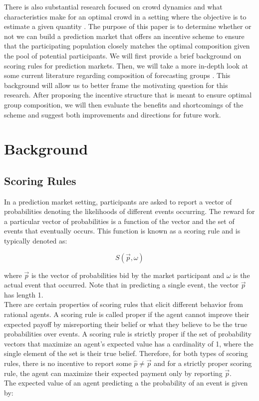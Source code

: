 \documentclass[twoside,twocolumn]{article}
\begin{document}
\newline
There is also substantial research focused on crowd dynamics and what characteristics make for an optimal crowd in a setting where the objective is to estimate a given quantity \cite{3}. The purpose of this paper is to determine whether or not we can build a prediction market that offers an incentive scheme to ensure that the participating population closely matches the optimal composition given the pool of potential participants. We will first provide a brief background on scoring rules for prediction markets. Then, we will take a more in-depth look at some current literature regarding composition of forecasting groups \cite{3}. This background will allow us to better frame the motivating question for this research. After proposing the incentive structure that is meant to ensure optimal group composition, we will then evaluate the benefits and shortcomings of the scheme and suggest both improvements and directions for future work.


\section{Background}

\subsection{Scoring Rules}

In a prediction market setting, participants are asked to report a vector of probabilities denoting the likelihoods of different events occurring. The reward for a particular vector of probabilities is a function of the vector and the set of events that eventually occurs. This function is known as a scoring rule and is typically denoted as:

\begin{equation}
\label{scoringrule}
S(\vec{p}, \omega)
\end{equation}

where $\vec{p}$ is the vector of probabilities bid by the market participant and $\omega$ is the actual event that occurred. Note that in predicting a single event, the vector $\vec{p}$ has length 1.\\
\newline
There are certain properties of scoring rules that elicit different behavior from rational agents. A scoring rule is called proper if the agent cannot improve their expected payoff by misreporting their belief or what they believe to be the true probabilities over events. A scoring rule
is strictly proper if the set of probability vectors that maximize an agent's expected value has a cardinality of 1, where the single element of the set is their true belief. Therefore, for both types of scoring rules, there is no incentive to report some $\hat{p} \neq \vec{p}$ and for a strictly proper scoring rule, the agent can maximize their expected payment only by reporting $\vec{p}$.\\
\newline
The expected value of an agent predicting a the probability of an event is given by:
\end{document}
